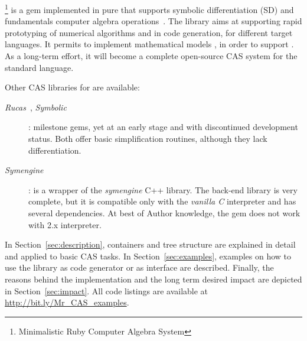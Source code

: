\ragnicas\footnote{Minimalistic Ruby Computer Algebra System} is a gem implemented in pure \Ruby that supports symbolic differentiation (SD) and fundamentals computer algebra operations~\cite{von2013modern}. The library aims at supporting  rapid prototyping of numerical algorithms and in code generation, for different target languages. It permits to implement mathematical models , in order to support . As a long-term effort, it will become a complete open-source CAS system for the standard \Ruby language.

Other CAS libraries for \Ruby are available:
\begin{description}
  \item [\emph{Rucas}~\cite{rucas}, \emph{Symbolic}~\cite{symbolic}]: milestone gems, yet at an early stage and with discontinued development status. Both offer basic simplification routines, although they lack differentiation.
  \item [\emph{Symengine}~\cite{symengine}]: is a wrapper of the \emph{symengine} C++ library. The back-end library is very complete, but it is compatible only with the \emph{vanilla C} \Ruby interpreter and has several dependencies.
  At best of Author knowledge, the gem does not work with \Ruby 2.x interpreter.
\end{description}

In Section~\ref{sec:description}, \ragnicas containers and tree structure are explained in detail and applied to basic CAS tasks. In Section~\ref{sec:examples}, examples on how to use the library as code generator or as interface are described. Finally, the reasons behind the implementation and the long term desired impact are depicted in Section~\ref{sec:impact}. All code listings are available at \url{http://bit.ly/Mr_CAS_examples}.
